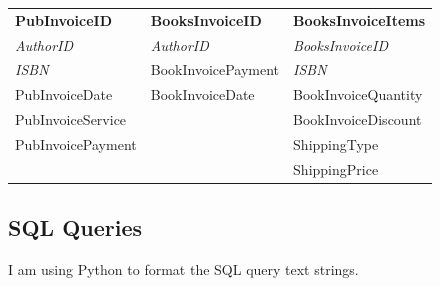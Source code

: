\begin{tabular}{|p{3cm}|p{3.5cm}|p{3.5cm}|}
    \hline
    \textbf{PubInvoiceID} & \textbf{BooksInvoiceID} & \textbf{BooksInvoiceItems} \\
    \emph{AuthorID} & \emph{AuthorID} & \emph{BooksInvoiceID} \\
    \emph{ISBN}& BookInvoicePayment & \emph{ISBN} \\
    PubInvoiceDate & BookInvoiceDate & BookInvoiceQuantity \\
    PubInvoiceService & & BookInvoiceDiscount \\
    PubInvoicePayment & & ShippingType \\
    & & ShippingPrice \\ 
    \hline
\end{tabular}

\subsection{SQL Queries}

I am using Python to format the SQL query text strings.

